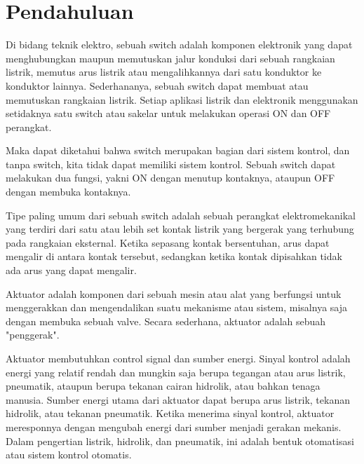 \section{Pendahuluan}
\label{sec:pendahuluan}


Di bidang teknik elektro, sebuah switch adalah komponen elektronik yang dapat menghubungkan maupun memutuskan jalur konduksi dari sebuah rangkaian listrik, memutus arus listrik atau mengalihkannya dari satu konduktor ke konduktor lainnya. Sederhananya, sebuah switch dapat membuat atau memutuskan rangkaian listrik. Setiap aplikasi listrik dan elektronik menggunakan setidaknya satu switch atau sakelar untuk melakukan operasi ON dan OFF perangkat.

Maka dapat diketahui bahwa switch merupakan bagian dari sistem kontrol, dan tanpa switch, kita tidak dapat memiliki sistem kontrol. Sebuah switch dapat melakukan dua fungsi, yakni ON dengan menutup kontaknya, ataupun OFF dengan membuka kontaknya.

Tipe paling umum dari sebuah switch adalah sebuah perangkat elektromekanikal yang terdiri dari satu atau lebih set kontak listrik yang bergerak yang terhubung pada rangkaian eksternal. Ketika sepasang kontak bersentuhan, arus dapat mengalir di antara kontak tersebut, sedangkan ketika kontak dipisahkan tidak ada arus yang dapat mengalir.

Aktuator adalah komponen dari sebuah mesin atau alat yang berfungsi untuk menggerakkan dan mengendalikan suatu mekanisme atau sistem, misalnya saja dengan membuka sebuah valve. Secara sederhana, aktuator adalah sebuah "penggerak".

Aktuator membutuhkan control signal dan sumber energi. Sinyal kontrol adalah energi yang relatif rendah dan mungkin saja berupa tegangan atau arus listrik, pneumatik, ataupun berupa tekanan cairan hidrolik, atau bahkan tenaga manusia. Sumber energi utama dari aktuator dapat berupa arus listrik, tekanan hidrolik, atau tekanan pneumatik. Ketika menerima sinyal kontrol, aktuator meresponnya dengan mengubah energi dari sumber menjadi gerakan mekanis. Dalam pengertian listrik, hidrolik, dan pneumatik, ini adalah bentuk otomatisasi atau sistem kontrol otomatis.
